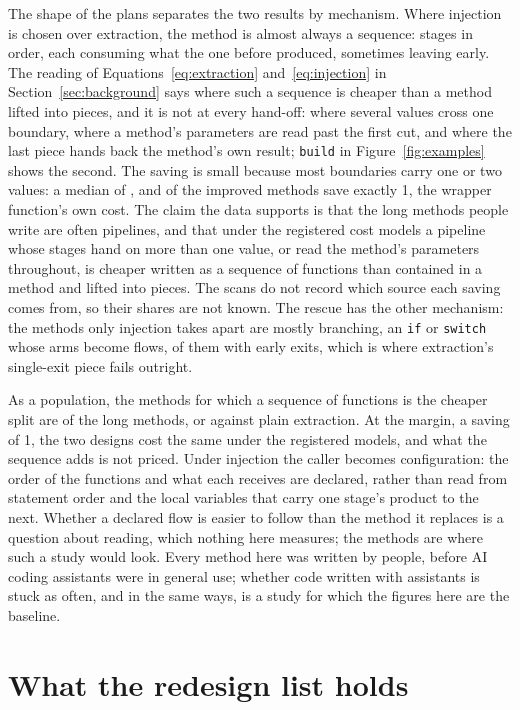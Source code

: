 \documentclass[11pt,a4paper]{article}
\newcommand{\sig}[1]{\texttt{#1}}
\begin{document}
The shape of the plans separates the two results by mechanism. Where
injection is chosen over extraction, the method is almost always a sequence:
stages in order, each consuming what the one before produced, sometimes
leaving early. The reading of Equations~\eqref{eq:extraction}
and~\eqref{eq:injection} in Section~\ref{sec:background} says where such a
sequence is cheaper than a method lifted into pieces, and it is not at every
hand-off: where several values cross one boundary, where a method's
parameters are read past the first cut, and where the last piece hands back
the method's own result; \sig{build} in Figure~\ref{fig:examples} shows
the second. The saving is small because most
boundaries carry one or two values: a median of \savingMedian{}, and
\savingOneShare{} of the improved methods save exactly 1, the wrapper
function's own cost. The claim the data supports is that the long methods
people write are often pipelines, and that under the registered cost models
a pipeline whose stages hand on more than one value, or read the method's
parameters throughout, is cheaper written as a sequence of functions than
contained in a method and lifted into pieces. The scans do not record which
source each saving comes from, so their shares are not known.
The rescue has the other mechanism: the methods only injection takes apart
are mostly branching, an \sig{if} or \sig{switch} whose arms become flows,
\shapeRescuedReturnsOfBranching{} of them with early exits, which is where
extraction's single-exit piece fails outright.

As a population, the methods for which a sequence of functions is the
cheaper split are \popSeqWay{} of the long methods, or \popSeqWayStrict{}
against plain extraction. At the margin, a saving of 1, the two designs cost
the same under the registered models, and what the sequence adds is not
priced. Under injection the caller becomes configuration: the order of the
functions and what each receives are declared, rather than read from
statement order and the local variables that carry one stage's product to
the next. Whether a declared flow is easier to follow than the method it
replaces is a question about reading, which nothing here measures; the
\nSeqWay{} methods are where such a study would look. Every method here was
written by people, before AI coding assistants were in general use; whether
code written with assistants is stuck as often, and in the same ways, is a
study for which the figures here are the baseline.

\section{What the redesign list holds}\label{sec:explore}
\end{document}

